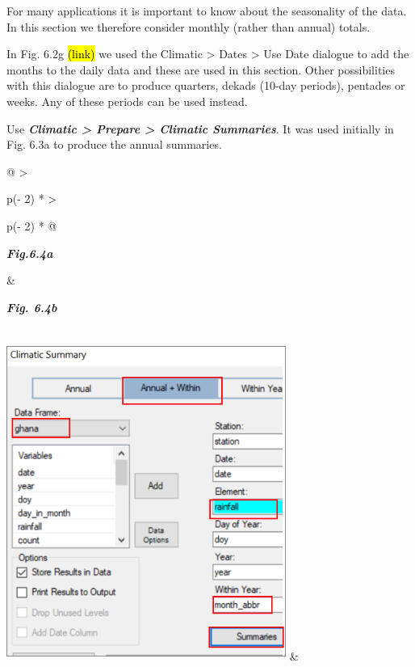 \documentclass[
  letterpaper,
  DIV=11,
  numbers=noendperiod]{scrreprt}
\begin{document}
For many applications it is important to know about the seasonality of
the data. In this section we therefore consider monthly (rather than
annual) totals.

In Fig. 6.2g \hl{(link)} we used the Climatic \textgreater{} Dates
\textgreater{} Use Date dialogue to add the months to the daily data and
these are used in this section. Other possibilities with this dialogue
are to produce quarters, dekads (10-day periods), pentades or weeks. Any
of these periods can be used instead.

Use \textbf{\emph{Climatic \textgreater{} Prepare \textgreater{}
Climatic Summaries}}. It was used initially in Fig. 6.3a to produce the
annual summaries.

\begin{longtable}[]{@{}
  >{\raggedright\arraybackslash}p{(\columnwidth - 2\tabcolsep) * }
  >{\raggedright\arraybackslash}p{(\columnwidth - 2\tabcolsep) * }@{}}
\toprule\noalign{}
\begin{minipage}[b]{\linewidth}\raggedright
\textbf{\emph{Fig.6.4a}}
\end{minipage} & \begin{minipage}[b]{\linewidth}\raggedright
\textbf{\emph{Fig. 6.4b}}
\end{minipage} \\
\midrule\noalign{}
\endhead
\bottomrule\noalign{}
\endlastfoot
\includegraphics[width=3.60435in,height=4.09049in]{figures/Fig6.4a.png}
&

\end{longtable}
\end{document}
